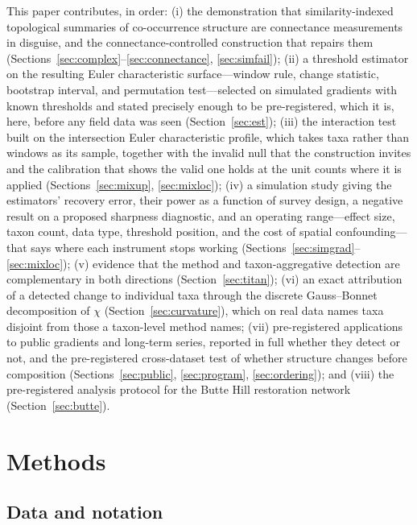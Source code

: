 \documentclass[review,12pt,authoryear]{elsarticle}
\theoremstyle{remark}
\begin{document}
This paper contributes, in order: (i) the demonstration that similarity-indexed
topological summaries of co-occurrence structure are connectance measurements in
disguise, and the connectance-controlled construction that repairs them
(Sections~\ref{sec:complex}--\ref{sec:connectance}, \ref{sec:simfail});
(ii) a threshold estimator on the resulting Euler characteristic surface---window rule, change statistic, bootstrap interval, and permutation test---selected on simulated gradients with known thresholds and stated precisely
enough to be pre-registered, which it is, here, before any field data was seen
(Section~\ref{sec:est}); (iii) the interaction test built on the intersection
Euler characteristic profile, which takes taxa rather than windows as its
sample, together with the invalid null that the construction invites and the
calibration that shows the valid one holds at the unit counts where it is
applied (Sections~\ref{sec:mixup}, \ref{sec:mixloc}); (iv) a simulation study giving the estimators'
recovery error, their power as a function of survey design, a negative result
on a proposed sharpness diagnostic, and an operating range---effect size,
taxon count, data type, threshold position, and the cost of spatial
confounding---that says where each instrument stops working
(Sections~\ref{sec:simgrad}--\ref{sec:mixloc}); (v) evidence that the method and taxon-aggregative detection
are complementary in both directions (Section~\ref{sec:titan}); (vi) an exact attribution of a detected change to individual taxa through
the discrete Gauss--Bonnet decomposition of $\chi$
(Section~\ref{sec:curvature}), which on real data names taxa disjoint from
those a taxon-level method names; (vii) pre-registered applications to
public gradients and long-term series, reported in full whether they
detect or not, and the pre-registered cross-dataset test of whether
structure changes before composition (Sections~\ref{sec:public},
\ref{sec:program}, \ref{sec:ordering}); and
(viii) the pre-registered analysis protocol for the Butte Hill restoration
network (Section~\ref{sec:butte}).

\section{Methods}

\subsection{Data and notation}
\label{sec:data}
\end{document}
